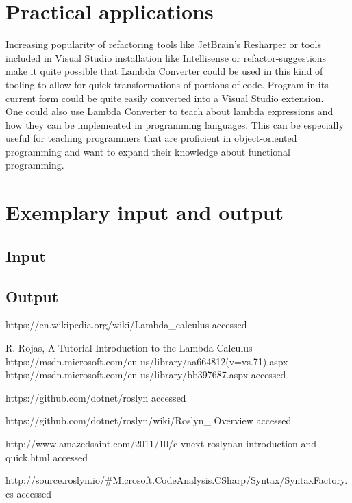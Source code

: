 \documentclass[]{report}
\begin{document}
    \section{Practical applications}
    Increasing popularity of refactoring tools like JetBrain's Resharper or tools included in Visual Studio installation like Intellisense or refactor-suggestions make it quite possible that Lambda Converter could be used in this kind of tooling to allow for quick transformations of portions of code. Program in its current form could be quite easily converted into a Visual Studio extension.
    \\
    One could also use Lambda Converter to teach about lambda expressions and how they can be implemented in programming languages. This can be especially useful for teaching programmers that are proficient in object-oriented programming and want to expand their knowledge about functional  programming.


\section {Exemplary input and output}\label{egIO}
    \subsection{Input}\label{testsInput}
    
    \pagebreak
    \subsection{Output}\label{testsOutput}
     
    \pagebreak
 
                  
    
    
\begin{thebibliography}{80}
     https://en.wikipedia.org/wiki/Lambda\_calculus accessed \date{01.05.2017}
     R. Rojas, A Tutorial Introduction to the Lambda Calculus
     https://msdn.microsoft.com/en-us/library/aa664812(v=vs.71).aspx
     https://msdn.microsoft.com/en-us/library/bb397687.aspx
    accessed \date{01.05.2017}
     https://github.com/dotnet/roslyn
    accessed \date{01.05.2017}
     https://github.com/dotnet/roslyn/wiki/Roslyn\_ Overview
    accessed \date{01.05.2017}
     http://www.amazedsaint.com/2011/10/c-vnext-roslynan-introduction-and-quick.html
    accessed \date{02.05.2017}
 http://source.roslyn.io/\#Microsoft.CodeAnalysis.CSharp/Syntax/SyntaxFactory.cs accessed \date{08.05.2017}

\end{thebibliography}
\end{document}
